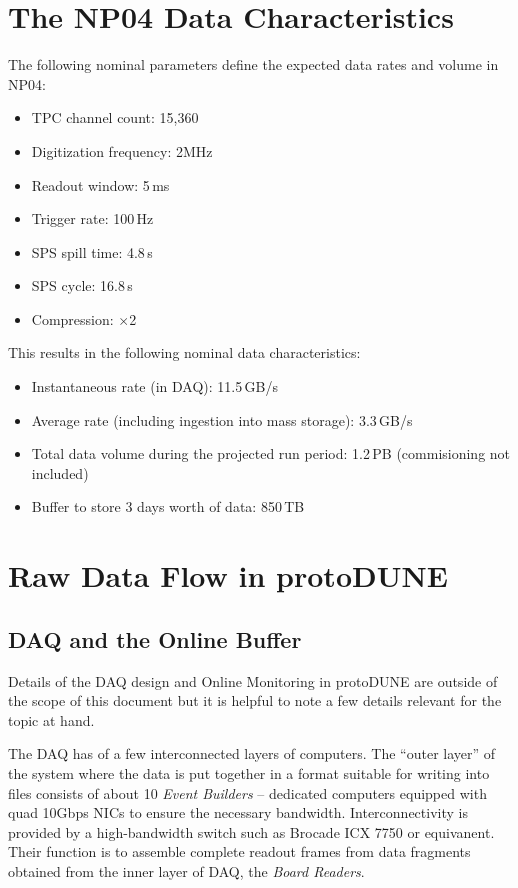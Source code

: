 \documentclass[a4paper]{jpconf}
\newcommand{\pd}{protoDUNE\xspace}
\begin{document}
\section{The NP04 Data Characteristics}
\label{sec:np04_data_rate}
The following nominal parameters define the expected data rates and volume in NP04:
\begin{itemize}
\item TPC channel count: 15,360
\item Digitization frequency: 2MHz
\item Readout window: 5\,ms
\item Trigger rate: 100\,Hz
\item SPS spill time: 4.8\,s
\item SPS cycle: 16.8\,s
\item Compression: $\times$2
\end{itemize}
\noindent This results in the following nominal data characteristics:
\begin{itemize}
\item Instantaneous rate (in DAQ): 11.5\,GB/s
\item Average rate (including ingestion into mass storage): 3.3\,GB/s
\item Total data volume during the projected run period: 1.2\,PB (commisioning not included)
\item Buffer to store 3 days worth of data: 850\,TB

\end{itemize}


\section{Raw Data Flow in \pd}
\label{sec:raw_concept}
\subsection{DAQ and the Online Buffer}
Details of the DAQ design and Online Monitoring in \pd are outside of the scope
of this document but it is helpful to note a few details relevant for the topic at hand.

The DAQ has of a few interconnected layers of computers.
The ``outer layer'' of the system where the data is put together in a format
suitable for writing into files consists of about 10
 \textit{Event Builders} -- dedicated computers equipped with quad 10Gbps NICs to ensure the necessary
bandwidth. Interconnectivity is provided by a high-bandwidth switch such as Brocade ICX 7750
or equivanent. Their function is to assemble complete readout frames from data
fragments obtained from the inner layer of DAQ, the \textit{Board Readers}.
\end{document}
